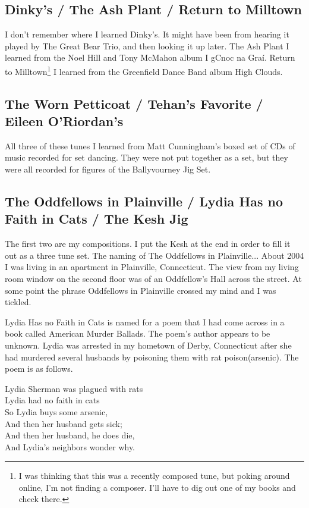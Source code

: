 \documentclass[11pt,letterpaper]{article}
\begin{document}
\subsection{Dinky's / The Ash Plant / Return to Milltown}

I don't remember where I learned Dinky's. It might have been from hearing it played by The Great Bear Trio, and then looking it up later. The Ash Plant I learned from the Noel Hill and Tony McMahon album I gCnoc na Graí. Return to Milltown\footnote{I was thinking that this was a recently composed tune, but poking around online, I'm not finding a composer. I'll have to dig out one of my books and check there.} I learned from the Greenfield Dance Band album High Clouds. 

\subsection{The Worn Petticoat / Tehan's Favorite / Eileen O'Riordan's}

All three of these tunes I learned from Matt Cunningham's boxed set of CDs of music recorded for set dancing. They were not put together as a set, but they were all recorded for figures of the Ballyvourney Jig Set. 

\subsection{The Oddfellows in Plainville / Lydia Has no Faith in Cats / The Kesh Jig}

The first two are my compositions. I put the Kesh at the end in order to fill it out as a three tune set. The naming of The Oddfellows in Plainville... About 2004 I was living in an apartment in Plainville, Connecticut. The view from my living room window on the second floor was of an Oddfellow's Hall across the street. At some point the phrase Oddfellows in Plainville crossed my mind and I was tickled. 

Lydia Has no Faith in Cats is named for a poem that I had come across in a book called American Murder Ballads. The poem's author appears to be unknown. Lydia was arrested in my hometown of Derby, Connecticut after she had murdered several husbands by poisoning them with rat poison(arsenic). The poem is as follows.

\hfill

\noindent Lydia Sherman was plagued with rats \\ 
Lydia had no faith in cats \\
So Lydia buys some arsenic, \\
And then her husband gets sick; \\
And then her husband, he does die, \\
And Lydia’s neighbors wonder why. \\
\end{document}

